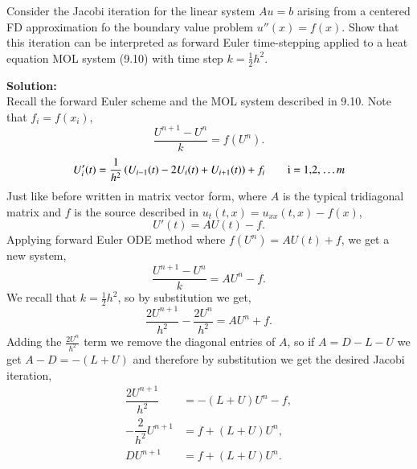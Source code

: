 \documentclass[12pt]{article}
\makeatletter
\theoremstyle{homework}
\newenvironment{exercise}[1]
{\def\@currentlabel{#1}\exercisecore}
{\endexercisecore}
\newcommand{\localhead}[1]{\par\smallskip\noindent\textbf{#1}\nobreak\\}%
\newcommand\solution{\localhead{Solution:}}
\makeatother
\begin{document}
\begin{exercise}{Problem P36} Consider the Jacobi iteration for the linear system $Au = b$
  arising from a centered FD approximation fo the boundary value problem $u''(x) = f(x)$. 
  Show that this iteration can be interpreted as forward Euler time-stepping applied to a heat equation
  MOL system (9.10) with time step $k = \frac{1}{2}h^2$. 
  \solution Recall the forward Euler scheme and the MOL system described in 9.10. Note that $f_i = f(x_i)$,
  \begin{equation*}
    \dfrac{U^{n + 1} - U^{n}}{k} = f(U^n).
  \end{equation*}
  \begin{equation*}
    U'_i(t) = \frac{1}{h^2}\left(U_{i - 1}(t) - 2U_i(t) + U_{i + 1}(t)\right) + f_i\qquad \text{i = 1,2, \dots $m$} 
  \end{equation*}
  Just like before written in matrix vector form, where $A$ is the typical tridiagonal matrix and $f$ is the source described in $u_t(t, x) = u_{xx}(t, x) - f(x)$,
  \begin{equation*}
    U'(t) = AU(t) - f.
  \end{equation*}
  Applying forward Euler ODE method where $f(U^n) = AU(t) + f$, we get a new system, 
  \begin{equation*}
    \dfrac{U^{n + 1} - U^{n}}{k} = AU^n - f.
  \end{equation*}
  We recall that $k = \frac{1}{2}h^2$, so by substitution we get, 
  \begin{equation*}
    \dfrac{2U^{n + 1}}{h^2} - \frac{2U^{n}}{h^2} = AU^n + f.
  \end{equation*}  Adding the $\frac{2U^{n}}{h^2}$ term we remove the diagonal entries of $A$, so
  if $A = D - L - U$ we get $A - D = -(L + U)$ and therefore by substitution we get the desired Jacobi iteration,
  \begin{align*}
    \dfrac{2U^{n + 1}}{h^2} &= -(L + U)U^n - f,\\
    -\dfrac{2}{h^2}U^{n + 1} &= f + (L + U)U^n,\\
    DU^{n + 1} &= f + (L + U)U^n.
  \end{align*}


\end{exercise}
\end{document}
